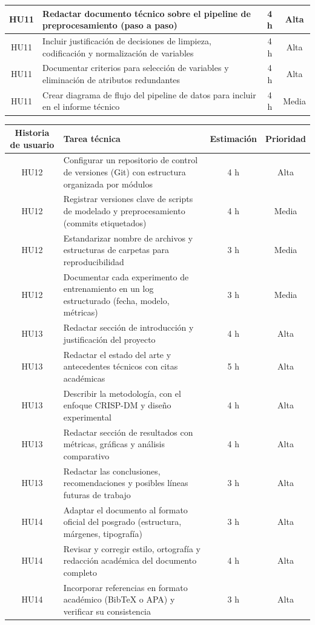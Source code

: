 \documentclass[
11pt, %
]{charter}
\begin{document}
\begin{table}[htpb]
\begin{tabularx}{\linewidth}{@{}|c|X|c|c|@{}}
HU11 & Redactar documento técnico sobre el pipeline de preprocesamiento (paso a paso) & 4 h & Alta \\ \hline
HU11 & Incluir justificación de decisiones de limpieza, codificación y normalización de variables & 4 h & Alta \\ \hline
HU11 & Documentar criterios para selección de variables y eliminación de atributos redundantes & 4 h & Alta \\ \hline
HU11 & Crear diagrama de flujo del pipeline de datos para incluir en el informe técnico & 4 h & Media \\ \hline

\end{tabularx}
\end{table}

\begin{table}[htpb]
\centering
\begin{tabularx}{\linewidth}{@{}|c|X|c|c|@{}}
\hline
\rowcolor[HTML]{C0C0C0}
Historia de usuario & Tarea técnica & Estimación & Prioridad \\ \hline

HU12 & Configurar un repositorio de control de versiones (Git) con estructura organizada por módulos & 4 h & Alta \\ \hline
HU12 & Registrar versiones clave de scripts de modelado y preprocesamiento (commits etiquetados) & 4 h & Media \\ \hline
HU12 & Estandarizar nombre de archivos y estructuras de carpetas para reproducibilidad & 3 h & Media \\ \hline
HU12 & Documentar cada experimento de entrenamiento en un log estructurado (fecha, modelo, métricas) & 3 h & Media \\ \hline

HU13 & Redactar sección de introducción y justificación del proyecto & 4 h & Alta \\ \hline
HU13 & Redactar el estado del arte y antecedentes técnicos con citas académicas & 5 h & Alta \\ \hline
HU13 & Describir la metodología, con el enfoque CRISP-DM y diseño experimental & 4 h & Alta \\ \hline
HU13 & Redactar sección de resultados con métricas, gráficas y análisis comparativo & 4 h & Alta \\ \hline
HU13 & Redactar las conclusiones, recomendaciones y posibles líneas futuras de trabajo & 3 h & Alta \\ \hline

HU14 & Adaptar el documento al formato oficial del posgrado (estructura, márgenes, tipografía) & 3 h & Alta \\ \hline
HU14 & Revisar y corregir estilo, ortografía y redacción académica del documento completo & 4 h & Alta \\ \hline
HU14 & Incorporar referencias en formato académico (BibTeX o APA) y verificar su consistencia & 3 h & Alta \\ \hline


\end{tabularx}
\end{table}
\end{document}
